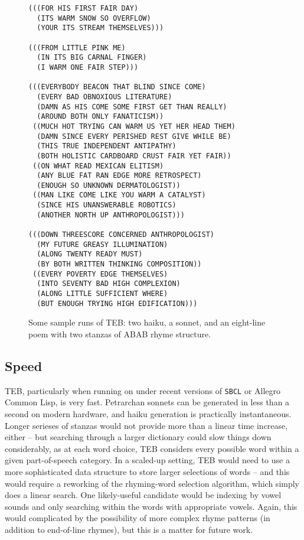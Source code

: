 \documentclass[12pt]{article}
\begin{document}
\begin{figure}
\begin{center}
\begin{verbatim}
(((FOR HIS FIRST FAIR DAY)
  (ITS WARM SNOW SO OVERFLOW)
  (YOUR ITS STREAM THEMSELVES)))

(((FROM LITTLE PINK ME)
  (IN ITS BIG CARNAL FINGER)
  (I WARM ONE FAIR STEP)))

(((EVERYBODY BEACON THAT BLIND SINCE COME)
  (EVERY BAD OBNOXIOUS LITERATURE)
  (DAMN AS HIS COME SOME FIRST GET THAN REALLY)
  (AROUND BOTH ONLY FANATICISM))
 ((MUCH HOT TRYING CAN WARM US YET HER HEAD THEM)
  (DAMN SINCE EVERY PERISHED REST GIVE WHILE BE)
  (THIS TRUE INDEPENDENT ANTIPATHY)
  (BOTH HOLISTIC CARDBOARD CRUST FAIR YET FAIR))
 ((ON WHAT READ MEXICAN ELITISM)
  (ANY BLUE FAT RAN EDGE MORE RETROSPECT)
  (ENOUGH SO UNKNOWN DERMATOLOGIST))
 ((MAN LIKE COME LIKE YOU WARM A CATALYST)
  (SINCE HIS UNANSWERABLE ROBOTICS)
  (ANOTHER NORTH UP ANTHROPOLOGIST)))

(((DOWN THREESCORE CONCERNED ANTHROPOLOGIST)
  (MY FUTURE GREASY ILLUMINATION)
  (ALONG TWENTY READY MUST)
  (BY BOTH WRITTEN THINKING COMPOSITION))
 ((EVERY POVERTY EDGE THEMSELVES)
  (INTO SEVENTY BAD HIGH COMPLEXION)
  (ALONG LITTLE SUFFICIENT WHERE)
  (BUT ENOUGH TRYING HIGH EDIFICATION)))
\end{verbatim}
\caption{Some sample runs of TEB: two haiku, a sonnet, and an eight-line
poem with two stanzas of ABAB rhyme structure.}
\label{sampleoutput}
\end{center}
\end{figure}

\subsection{Speed}
TEB, particularly when running on under recent versions of \verb+SBCL+ or
Allegro Common Lisp, is very fast. Petrarchan sonnets can be generated
in less than a second on modern hardware, and haiku generation is
practically instantaneous. Longer serieses of stanzas would not provide
more than a linear time increase, either -- but searching through a larger
dictionary could slow things down considerably, as at each word choice, TEB
considers every possible word within a given part-of-speech category. In a
scaled-up setting, TEB would need to use a more sophisticated data
structure to store larger selections of words -- and this would require a
reworking of the rhyming-word selection algorithm, which simply does a
linear search. One likely-useful candidate would be indexing by vowel
sounds and only searching within the words with appropriate vowels. Again,
this would complicated by the possibility of more complex rhyme
patterns (in addition to end-of-line rhymes), but this is a matter for
future work.
\end{document}
